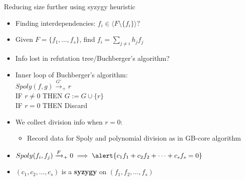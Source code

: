 \documentclass[xcolor=dvipsnames]{beamer}
\newcommand{\bi}{\begin{itemize}}
\newcommand{\ei}{\end{itemize}}
\begin{document}
\begin{frame}{\large{Reducing size further using syzygy heuristic}}
\bi
\item Finding interdependencies: $f_i\in\langle F\setminus\{f_i\}\rangle$?
\item Given $F=\{f_1,\dots,f_s\}$, find $f_i = \sum_{j\neq i} h_jf_j$
\item Info lost in refutation tree/Buchberger's algorithm?
\item Inner loop of Buchberger's algorithm: \\
\hspace{0.2in}  $Spoly(f, g) \stackrel{G'}{\textstyle\longrightarrow}_+
r$ \\
\hspace{0.2in}  \alert{IF $r \neq 0$} THEN $G:= G \cup \{r\}$ \\
\hspace{0.2in}  \alert{IF $r = 0$} THEN Discard 

\item We collect division info when $r = 0$:
	\bi
	\item Record data for Spoly and polynomial division as in GB-core algorithm
	\ei
\item $Spoly(f_i,f_j)\xrightarrow{F}_+ 0\implies \alert{c_1f_1+c_2f_2+\cdots+c_sf_s = 0}$
\pause
\item $(c_1,c_2,\dots,c_s)$ is a {\bf syzygy} on $(f_1,f_2,\dots,f_s)$
\ei
\end{frame}
\end{document}
